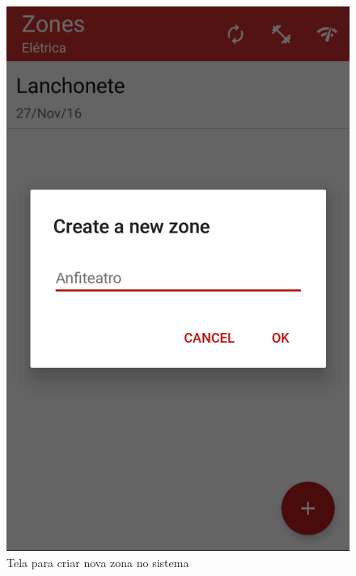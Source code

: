 \begin{figure}[H]
\begin{minipage}[b]{0.4\textwidth}
    \includegraphics[width=\textwidth]{imagens/screenshots/newZone.png}
    \caption{Tela para criar nova zona no sistema}
  \end{minipage}
\end{figure}

